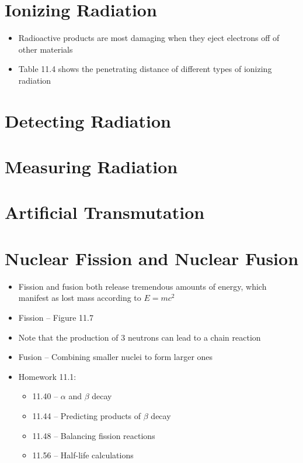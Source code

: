 \documentclass[12pt, openany, letterpaper]{memoir}
\begin{document}
\section{Ionizing Radiation}
\begin{itemize}
	\item Radioactive products are most damaging when they eject electrons off of other materials
	\item Table 11.4 shows the penetrating distance of different types of ionizing radiation
\end{itemize}
\section{Detecting Radiation}
\section{Measuring Radiation}
\section{Artificial Transmutation}
\section{Nuclear Fission and Nuclear Fusion}
\begin{itemize}
	\item Fission and fusion both release tremendous amounts of energy, which manifest as lost mass according to $E=mc^2$
	\item Fission -- Figure 11.7

	\item Note that the production of 3 neutrons can lead to a chain reaction
	\item Fusion -- Combining smaller nuclei to form larger ones



	\item Homework 11.1:
	      \begin{itemize}
		      \item 11.40 -- $\alpha$ and $\beta$ decay
		      \item 11.44 -- Predicting products of $\beta$ decay
		      \item 11.48 -- Balancing fission reactions
		      \item 11.56 -- Half-life calculations
	      \end{itemize}
\end{itemize}
\end{document}
